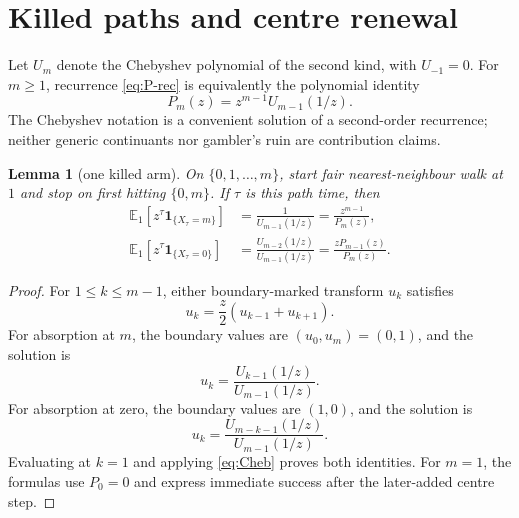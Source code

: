 \documentclass[a4paper,10pt]{amsart}
\newtheorem{lemma}[theorem]{Lemma}
\theoremstyle{remark}
\newcommand{\E}{\mathbb E}
\newcommand{\one}{\mathbf 1}
\begin{document}
\section{Killed paths and centre renewal}\label{sec:transform}

Let $U_m$ denote the Chebyshev polynomial of the second kind, with
$U_{-1}=0$.  For $m\ge1$, recurrence \eqref{eq:P-rec} is equivalently the
polynomial identity
\begin{equation}\label{eq:Cheb}
 P_m(z)=z^{m-1}U_{m-1}(1/z).
\end{equation}
The Chebyshev notation is a convenient solution of a second-order recurrence;
neither generic continuants nor gambler's ruin are contribution claims.

\begin{lemma}[one killed arm]\label{lem:arm}
On $\{0,1,\ldots,m\}$, start fair nearest-neighbour walk at $1$ and stop on
first hitting $\{0,m\}$.  If $\tau$ is this path time, then
\begin{align}
 \E_1[z^\tau\one_{\{X_\tau=m\}}]
   &=\frac1{U_{m-1}(1/z)}=\frac{z^{m-1}}{P_m(z)},\label{eq:success-arm}\\
 \E_1[z^\tau\one_{\{X_\tau=0\}}]
   &=\frac{U_{m-2}(1/z)}{U_{m-1}(1/z)}
     =\frac{zP_{m-1}(z)}{P_m(z)}.\label{eq:return-arm}
\end{align}
\end{lemma}

\begin{proof}
For $1\le k\le m-1$, either boundary-marked transform $u_k$ satisfies
\[
 u_k=\frac z2(u_{k-1}+u_{k+1}).
\]
For absorption at $m$, the boundary values are $(u_0,u_m)=(0,1)$, and the
solution is
\[
 u_k=\frac{U_{k-1}(1/z)}{U_{m-1}(1/z)}.
\]
For absorption at zero, the boundary values are $(1,0)$, and the solution is
\[
 u_k=\frac{U_{m-k-1}(1/z)}{U_{m-1}(1/z)}.
\]
Evaluating at $k=1$ and applying
\eqref{eq:Cheb} proves both identities.  For $m=1$, the formulas use
$P_0=0$ and express immediate success after the later-added centre step.
\end{proof}
\end{document}
